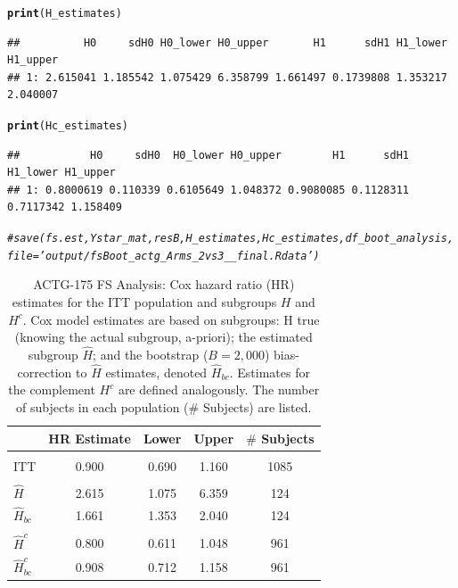 \documentclass[9pt]{article}\usepackage[]{graphicx}\usepackage[]{xcolor}
\makeatletter
\newcommand{\hlcom}[1]{\textcolor[rgb]{0.678,0.584,0.686}{\textit{#1}}}%
\newcommand{\hlstd}[1]{\textcolor[rgb]{0.345,0.345,0.345}{#1}}%
\newcommand{\hlkwd}[1]{\textcolor[rgb]{0.737,0.353,0.396}{\textbf{#1}}}%
\newenvironment{kframe}{%
 \def\at@end@of@kframe{}%
 \ifinner\ifhmode%
  \def\at@end@of@kframe{\end{minipage}}%
  \begin{minipage}{\columnwidth}%
 \fi\fi%
 \def\FrameCommand##1{\hskip\@totalleftmargin \hskip-\fboxsep
 \colorbox{shadecolor}{##1}\hskip-\fboxsep
     \hskip-\linewidth \hskip-\@totalleftmargin \hskip\columnwidth}%
 \MakeFramed {\advance\hsize-\width
   \@totalleftmargin\z@ \linewidth\hsize
   \@setminipage}}%
 {\par\unskip\endMakeFramed%
 \at@end@of@kframe}
\newenvironment{knitrout}{}{} %
\theoremstyle{definition}
\theoremstyle{remark}
\makeatother
\begin{document}
\begin{knitrout}
\begin{kframe}
\begin{alltt}
\hlkwd{print}\hlstd{(H_estimates)}
\end{alltt}
\begin{verbatim}
##          H0     sdH0 H0_lower H0_upper       H1      sdH1 H1_lower H1_upper
## 1: 2.615041 1.185542 1.075429 6.358799 1.661497 0.1739808 1.353217 2.040007
\end{verbatim}
\begin{alltt}
\hlkwd{print}\hlstd{(Hc_estimates)}
\end{alltt}
\begin{verbatim}
##           H0     sdH0  H0_lower H0_upper        H1      sdH1  H1_lower H1_upper
## 1: 0.8000619 0.110339 0.6105649 1.048372 0.9080085 0.1128311 0.7117342 1.158409
\end{verbatim}
\begin{alltt}
\hlcom{# save(fs.est,Ystar_mat,resB,H_estimates,Hc_estimates,df_boot_analysis,file='output/fsBoot_actg_Arms_2vs3__final.Rdata')}
\end{alltt}
\end{kframe}
\end{knitrout}








\begin{table}[!h]

\caption{\label{tab:fs_tab}\label{tab:actg} ACTG-175 FS Analysis: Cox hazard ratio (HR) estimates for the ITT population and subgroups $H$ and $H^{c}$.
Cox model estimates are based on subgroups: H true (knowing the actual subgroup, a-priori); the estimated subgroup $\hat{H}$; and 
the bootstrap ($B=2,000$) bias-correction to $\hat{H}$ estimates, denoted $\hat{H}_{bc}$.  Estimates for the complement $H^{c}$ are defined analogously.
The number of subjects in each population ($\#$ Subjects) are listed.}
\centering
\fontsize{9}{11}\selectfont
\begin{tabular}[t]{lcccc}
\toprule
  & HR Estimate & Lower & Upper & $\#$ Subjects\\
\midrule
\addlinespace[0.3em]
\multicolumn{5}{l}{\textbf{ITT}}\\
\hspace{1em}ITT & 0.900 & 0.690 & 1.160 & 1085\\
\addlinespace[0.3em]
\multicolumn{5}{l}{\textbf{H subgroup estimates}}\\
\hspace{1em}$\hat{H}$ & 2.615 & 1.075 & 6.359 & 124\\
\hspace{1em}$\hat{H}_{bc}$ & 1.661 & 1.353 & 2.040 & 124\\
\addlinespace[0.3em]
\multicolumn{5}{l}{\textbf{H-complement subgroup estimates}}\\
\hspace{1em}$\hat{H}^{c}$ & 0.800 & 0.611 & 1.048 & 961\\
\hspace{1em}$\hat{H}^{c}_{bc}$ & 0.908 & 0.712 & 1.158 & 961\\
\bottomrule
\end{tabular}
\end{table}
\end{document}
